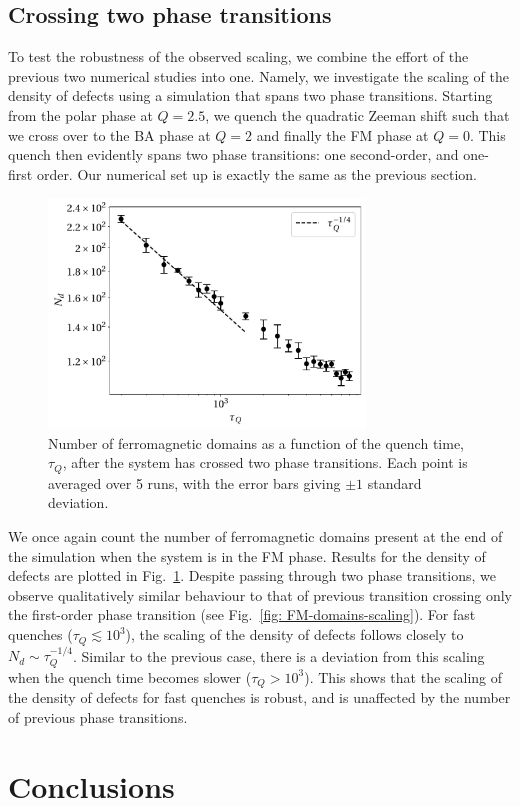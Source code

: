 \subsection{Crossing two phase transitions}
To test the robustness of the observed scaling, we combine the effort of the
previous two numerical studies into one.
Namely, we investigate the scaling of the density of defects using a simulation
that spans two phase transitions.
Starting from the polar phase at \(Q  = 2.5\), we quench the quadratic Zeeman
shift such that we cross over to the BA phase at \(Q=2\) and finally the FM
phase at \(Q=0\).
This quench then evidently spans two phase transitions: one second-order, and
one-first order.
Our numerical set up is exactly the same as the previous section.

\begin{figure}
    \centering
    \includegraphics[width=0.75\textwidth]{gfx/ch-spin1/polar-BA-FM_domains.pdf}
    \caption{\label{fig: polar-ba-fm-defects}Number of ferromagnetic domains as
    a function of the quench time, \(\tau_Q\), after the system has crossed two
    phase transitions.
    Each point is averaged over 5 runs, with the error bars giving \(\pm 1\)
    standard deviation.}
\end{figure}
We once again count the number of ferromagnetic domains present at the end of
the simulation when the system is in the FM phase.
Results for the density of defects are plotted in
Fig.~\ref{fig: polar-ba-fm-defects}.
Despite passing through two phase transitions, we observe qualitatively similar
behaviour to that of previous transition crossing only the first-order phase
transition (see Fig.~\ref{fig: FM-domains-scaling}).
For fast quenches (\(\tau_Q \lesssim 10^3 \)), the scaling of the density of
defects follows closely to \(N_d \sim \tau_Q^{-1/4}\).
Similar to the previous case, there is a deviation from this scaling when the
quench time becomes slower (\(\tau_Q > 10^3\)).
This shows that the scaling of the density of defects for fast quenches is
robust, and is unaffected by the number of previous phase transitions.

\section{Conclusions}
